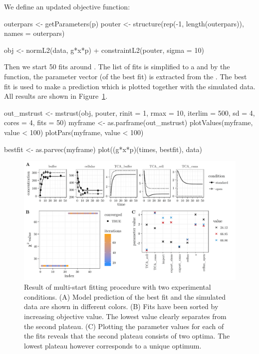 \documentclass[article]{jss}
\begin{document}
We define an updated objective function:
\begin{CodeChunk}
\begin{CodeInput}
outerpars <- getParameters(p)
pouter <- structure(rep(-1, length(outerpars)), names = outerpars)

obj <- normL2(data, g*x*p) + constraintL2(pouter, sigma = 10)
\end{CodeInput}
\end{CodeChunk}

Then we start 50 fits around . The list of fits is simplified to a  and by the  function, the parameter vector (of the best fit) is extracted from the . The best fit is used to make a prediction which is plotted together with the simulated data. All results are shown in Figure~\ref{fig:twoconditions}.

\begin{CodeChunk}
\begin{CodeInput}
out_mstrust <- mstrust(obj, pouter, rinit = 1, rmax = 10, iterlim = 500,
		       sd = 4, cores = 4, fits = 50)
myframe <- as.parframe(out_mstrust)
plotValues(myframe, value < 100)
plotPars(myframe, value < 100)

bestfit <- as.parvec(myframe)
plot((g*x*p)(times, bestfit), data)
\end{CodeInput}
\end{CodeChunk}
\begin{figure}[ht]
	\centering
	\includegraphics[width = \textwidth]{images/figure6}
	\caption{Result of multi-start fitting procedure with two experimental conditions. (A) Model prediction of the best fit and the simulated data are shown in different colors. (B) Fits have been sorted by increasing objective value. The lowest value clearly separates from the second plateau. (C) Plotting the parameter values for each of the fits reveals that the second plateau consists of two optima. The lowest plateau however corresponds to a unique optimum.}
	\label{fig:twoconditions}
\end{figure}
\end{document}
